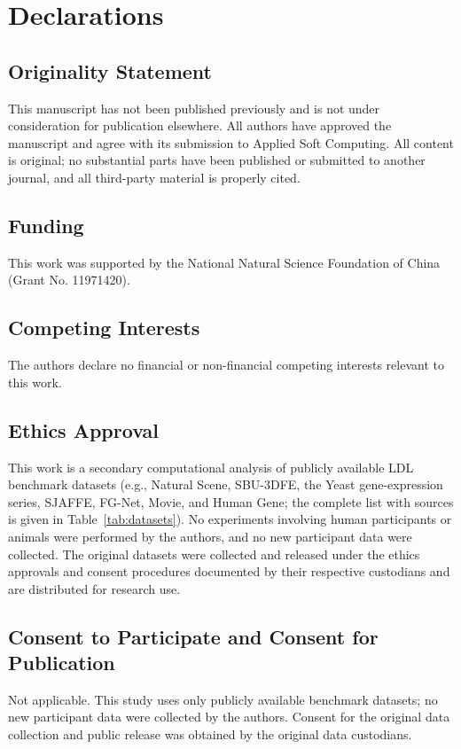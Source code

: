 \section*{Declarations}

\subsection*{Originality Statement}
This manuscript has not been published previously and is not under consideration for publication elsewhere. All authors have approved the manuscript and agree with its submission to Applied Soft Computing. All content is original; no substantial parts have been published or submitted to another journal, and all third-party material is properly cited.

\subsection*{Funding}
This work was supported by the National Natural Science Foundation of China (Grant No. 11971420).

\subsection*{Competing Interests}
The authors declare no financial or non-financial competing interests relevant to this work.

\subsection*{Ethics Approval}
This work is a secondary computational analysis of publicly available LDL benchmark datasets (e.g., Natural Scene, SBU-3DFE, the Yeast gene-expression series, SJAFFE, FG-Net, Movie, and Human Gene; the complete list with sources is given in Table~\ref{tab:datasets}). No experiments involving human participants or animals were performed by the authors, and no new participant data were collected. The original datasets were collected and released under the ethics approvals and consent procedures documented by their respective custodians and are distributed for research use.

\subsection*{Consent to Participate and Consent for Publication}
Not applicable. This study uses only publicly available benchmark datasets; no new participant data were collected by the authors. Consent for the original data collection and public release was obtained by the original data custodians.

